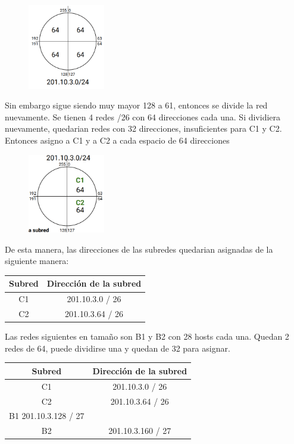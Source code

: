 \begin{figure}[H]
\centering
\includegraphics[width=0.3\textwidth]{imagenes/subnetting14.png}
\end{figure}


Sin embargo sigue siendo muy mayor 128 a 61, entonces se divide la red nuevamente. Se tienen 4 redes /26 con 64 direcciones cada una. Si dividiera nuevamente, quedarian redes con 32 direcciones, insuficientes para C1 y C2. Entonces asigno a C1 y a C2 a cada espacio de 64 direcciones

\begin{figure}[H]
\centering
\includegraphics[width=0.3\textwidth]{imagenes/subnetting15.png}
\end{figure}

De esta manera, las direcciones de las subredes quedarian asignadas de la siguiente manera:

\begin{center}
    \begin{tabular}{c|c}
    Subred & Dirección de la subred \\
    \hline
    \hline
    C1     & 201.10.3.0 / 26 \\
    C2     & 201.10.3.64 / 26
    \end{tabular}
\end{center}


Las redes siguientes en tamaño son B1 y B2 con 28 hosts cada una. Quedan 2 redes de 64, puede dividirse una y quedan de 32 para asignar.


\begin{center}
    \begin{tabular}{c|c}
    Subred & Dirección de la subred \\
    \hline
    \hline
    C1     & 201.10.3.0 / 26 \\
    C2     & 201.10.3.64 / 26 \\
    B1     201.10.3.128 / 27 \\
    B2     & 201.10.3.160 / 27
    \end{tabular}
\end{center}


